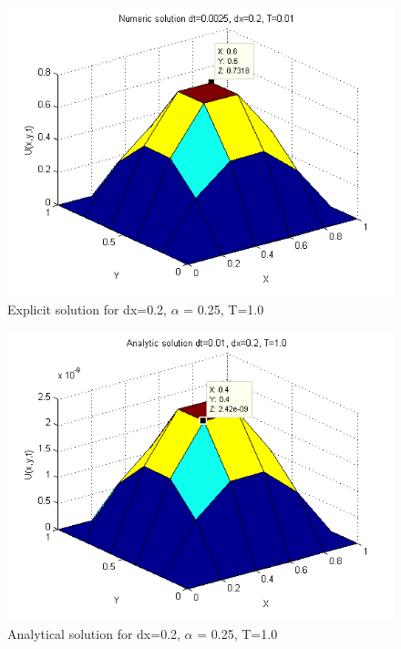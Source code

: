\documentclass[a4paper,10pt]{article}
\begin{document}
{\begin{figure}
  \begin{center}
    \includegraphics[scale=0.5]{num_dt00025_dx02_T001}
    \caption{Explicit solution for dx=0.2, $\alpha$ = 0.25, T=1.0}
    \label{fig:Num_dx0.2}
  \end{center}
\end{figure}

\begin{figure}
  \begin{center}
    \includegraphics[scale=0.5]{ana_dt001_dx02_T10}
    \caption{Analytical solution for dx=0.2, $\alpha$ = 0.25, T=1.0}
    \label{fig:Ana_dx0.2}
  \end{center}


\end{figure}}
\end{document}
